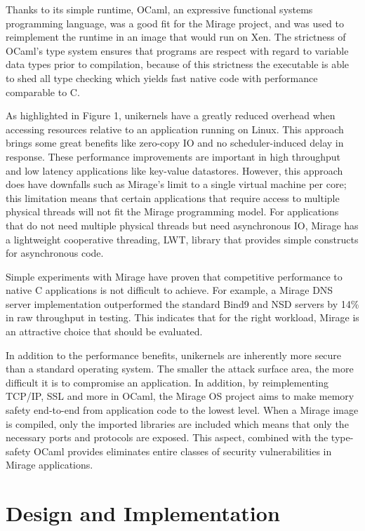 \documentclass[english,10pt,twocolumn]{article}
\begin{document}
Thanks to its simple runtime, OCaml, an expressive functional systems programming language, was a good fit for the Mirage project, and was used to re\-implement the runtime in an image that would run on Xen.
The strictness of OCaml's type system ensures that programs are respect with regard to variable data types prior to compilation, because of this strictness the executable is able to shed all type checking which yields fast native code with performance comparable to C.

As highlighted in Figure 1, unikernels have a greatly reduced overhead when accessing resources relative to an application running on Linux.
This approach brings some great benefits like zero-copy IO and no scheduler-induced delay in response.
These performance improvements are important in high throughput and low latency applications like key-value datastores.
However, this approach does have downfalls such as Mirage's limit to a single virtual machine per core; this limitation means that certain applications that require access to multiple physical threads will not fit the Mirage programming model.
For applications that do not need multiple physical threads but need asynchronous IO, Mirage has a lightweight cooperative threading, LWT, library that provides simple constructs for asynchronous code.

Simple experiments with Mirage have proven that competitive performance to native C applications is not difficult to achieve.
For example, a Mirage DNS server implementation outperformed the standard Bind9 and NSD servers by 14\% in raw throughput in testing.
This indicates that for the right workload, Mirage is an attractive choice that should be evaluated.

In addition to the performance benefits, unikernels are inherently more secure than a standard operating system.
The smaller the attack surface area, the more difficult it is to compromise an application.
In addition, by reimplementing TCP/IP, SSL and more in OCaml, the Mirage OS project aims to make memory safety end-to-end from application code to the lowest level.
When a Mirage image is compiled, only the imported libraries are included which means that only the necessary ports and protocols are exposed.
This aspect, combined with the type-safety OCaml provides eliminates entire classes of security vulnerabilities in Mirage applications.


\section{Design and Implementation}
\end{document}

